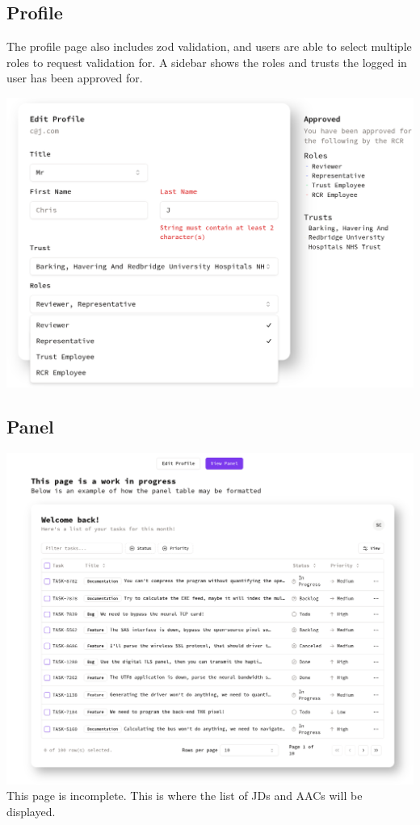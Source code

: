 \begin{minipage}{0.3\textwidth}
\subsection{Profile}
    The profile page also includes zod validation, and users are able to select multiple roles to request validation for. A sidebar shows the roles and trusts the logged in user has been approved for.
\end{minipage}
\hfill
\begin{minipage}{0.66\textwidth}
\includegraphics[width=\textwidth]{images/profile.png}
\end{minipage}

\subsection{Panel}
\includegraphics[width=\linewidth]{images/panel.png}
This page is incomplete. This is where the list of JDs and AACs will be displayed.